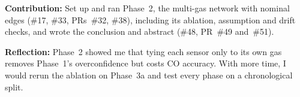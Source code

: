 \textbf{Contribution:} Set up and ran Phase~2, the multi-gas network with nominal edges
(\#17, \#33, PRs~\#32, \#38), including its ablation, assumption and drift checks,
and wrote the conclusion and abstract (\#48, PR~\#49 and~\#51).

\noindent\textbf{Reflection:} Phase~2 showed me that tying each sensor only to
its own gas removes Phase~1's overconfidence but costs CO accuracy.
With more time, I would rerun the ablation on
Phase~3a and test every phase on a chronological split.